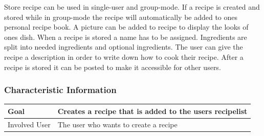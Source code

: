 \documentclass[12pt]{article}
\theoremstyle{definition}
\begin{document}
Store recipe can be used in single-user and group-mode. If a recipe is created and stored while in group-mode the recipe will automatically be added to ones personal recipe book. A picture can be added to recipe to display the looks of ones dish. When a recipe is stored a name has to be assigned. Ingredients are split into needed ingredients and optional ingredients. The user can give the recipe a description in order to write down how to cook their recipe. After a recipe is stored it can be posted to make it accessible for other users.

\subsubsection{Characteristic Information}

\begin{tabular}{|l|l|}
\hline
Goal & Creates a recipe that is added to the users recipelist  \\ \hline
Involved User & The user who wants to create a recipe \\ \hline
\end{tabular}
\pagebreak
\end{document}
